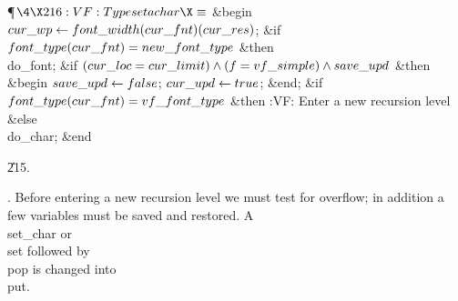 \Y\P$\4\X216:VF: Typeset a \\{char}\X\S$\6
\&{begin} $\\{cur\_wp}\gets\\{font\_width}(\\{cur\_fnt})(\\{cur\_res})$;\6
\&{if} $\\{font\_type}(\\{cur\_fnt})=\\{new\_font\_type}$ \1\&{then}\5
\\{do\_font};\2\6
\&{if} $(\\{cur\_loc}=\\{cur\_limit})\land(\hbox{$f$}=\\{vf\_simple})\land\\{save\_upd}$ \1%
\&{then}\6
\&{begin} $\\{save\_upd}\gets\\{false}$;\5
$\\{cur\_upd}\gets\\{true}$;\6
\&{end};\2\6
\&{if} $\\{font\_type}(\\{cur\_fnt})=\\{vf\_font\_type}$ \1\&{then}\5
:VF: Enter a new recursion level\X\6
\4\&{else} \\{do\_char};\2\6
\&{end}\par
\U215.\fi

. Before entering a new recursion level we must test for overflow; in
addition a few variables must be saved and restored.
A \\{set\_char} or \\{set} followed by \\{pop} is changed into \\{put}.

